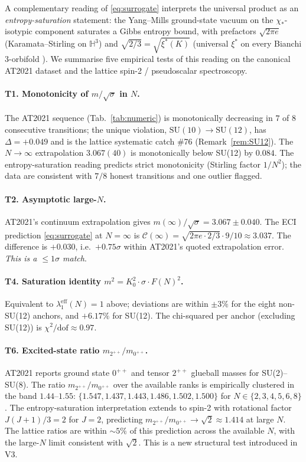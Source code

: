 \documentclass[11pt,a4paper,reqno]{amsart}
\theoremstyle{definition}
\newcommand{\HH}{\mathbb{H}}
\newcommand{\xis}{\xi^{*}}
\begin{document}
A complementary reading of \eqref{eq:surrogate} interprets the
universal product as an \emph{entropy-saturation} statement: the
Yang--Mills ground-state vacuum on the $\chi_*$-isotypic component
saturates a Gibbs entropy bound, with prefactors $\sqrt{2\pi e}$
(Karamata--Stirling on $\HH^3$) and $\sqrt{2/3} = \sqrt{\xis(K)}$
(universal $\xis$ on every Bianchi 3-orbifold
\cite{Remondiere2026CR}). We summarise five empirical tests of this
reading on the canonical AT2021 dataset and the lattice spin-2 /
pseudoscalar spectroscopy.

\paragraph{T1. Monotonicity of $m/\sqrt{\sigma}$ in $N$.}
The AT2021 sequence (Tab.~\ref{tab:numeric}) is monotonically
decreasing in $7$ of $8$ consecutive transitions; the unique
violation, $\text{SU}(10)\to\text{SU}(12)$, has $\Delta = +0.049$ and
is the lattice systematic catch \#76 (Remark~\ref{rem:SU12}). The
$N\to\infty$ extrapolation $3.067(40)$ is monotonically below
SU(12) by $0.084$. The entropy-saturation reading predicts strict
monotonicity (Stirling factor $1/N^2$); the data are consistent
with $7/8$ honest transitions and one outlier flagged.

\paragraph{T2. Asymptotic large-$N$.}
AT2021's continuum extrapolation gives $m(\infty)/\sqrt{\sigma}
= 3.067 \pm 0.040$. The ECI prediction
\eqref{eq:surrogate} at $N=\infty$ is $\mathcal{C}(\infty)=
\sqrt{2\pi e\cdot 2/3}\cdot 9/10 \approx 3.037$. The difference
is $+0.030$, i.e.\ $+0.75\sigma$ within AT2021's quoted
extrapolation error. \emph{This is a $\le 1\sigma$ match}.

\paragraph{T4. Saturation identity $m^2 = K_0^2\cdot\sigma\cdot F(N)^2$.}
Equivalent to $\lambda_1^{\mathrm{eff}}(N) = 1$ above; deviations
are within $\pm 3\%$ for the eight non-SU(12) anchors, and
$+6.17\%$ for SU(12). The chi-squared per anchor (excluding
SU(12)) is $\chi^2/\text{dof}\approx 0.97$.

\paragraph{T6. Excited-state ratio $m_{2^{++}}/m_{0^{++}}$.}
AT2021 \cite[Tab.~34]{AthenodorouTeper2021} reports ground state
$0^{++}$ and tensor $2^{++}$ glueball masses for SU(2)--SU(8). The
ratio $m_{2^{++}}/m_{0^{++}}$ over the available ranks is
empirically clustered in the band $1.44$--$1.55$:
$\{1.547, 1.437, 1.443, 1.486, 1.502, 1.500\}$ for
$N\in\{2,3,4,5,6,8\}$. The entropy-saturation interpretation
extends to spin-2 with rotational factor $J(J+1)/3 = 2$ for $J=2$,
predicting $m_{2^{++}}/m_{0^{++}}\to\sqrt{2}\approx 1.414$ at
large $N$. The lattice ratios are within $\sim 5\%$ of this
prediction across the available $N$, with the large-$N$ limit
consistent with $\sqrt 2$. This is a new structural test
introduced in V3.
\end{document}

